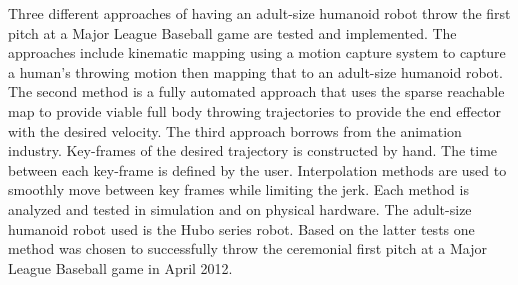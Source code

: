 Three different approaches of having an adult-size humanoid robot throw the first pitch at a Major League Baseball game are tested and implemented.  The approaches include kinematic mapping using a motion capture system to capture a human's throwing motion then mapping that to an adult-size humanoid robot.  The second method is a fully automated approach that uses the sparse reachable map to provide viable full body throwing trajectories to provide the end effector with the desired velocity.  The third approach borrows from the animation industry.  Key-frames of the desired trajectory is constructed by hand.  The time between each key-frame is defined by the user.  Interpolation methods are used to smoothly move between key frames while limiting the jerk.  Each method is analyzed and tested in simulation and on physical hardware.  The adult-size humanoid robot used is the Hubo series robot.  Based on the latter tests one method was chosen to successfully throw the ceremonial first pitch at a Major League Baseball game in April 2012.